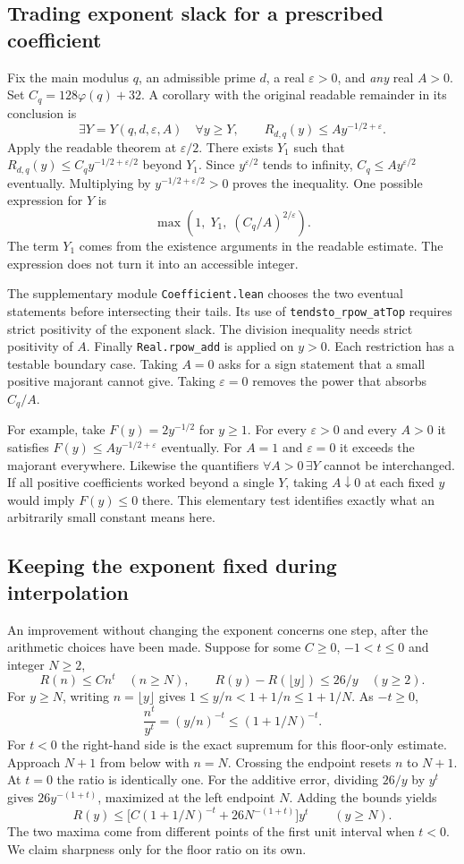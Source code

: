 \documentclass[12pt,letterpaper]{article}
\newcommand{\id}[1]{{\small\nolinkurl{#1}}}
\begin{document}
\subsection{Trading exponent slack for a prescribed coefficient}
Fix the main modulus $q$, an admissible prime $d$, a real $\varepsilon>0$, and \emph{any} real $A>0$. Set $C_q=128\varphi(q)+32$. A corollary with the original readable remainder in its conclusion is
\[
   \exists Y=Y(q,d,\varepsilon,A)\quad
   \forall y\ge Y,\qquad R_{d,q}(y)\le A y^{-1/2+\varepsilon}.
\]
Apply the readable theorem at $\varepsilon/2$. There exists $Y_1$ such that $R_{d,q}(y)\le C_q y^{-1/2+\varepsilon/2}$ beyond $Y_1$. Since $y^{\varepsilon/2}$ tends to infinity, $C_q\le A y^{\varepsilon/2}$ eventually. Multiplying by $y^{-1/2+\varepsilon/2}>0$ proves the inequality. One possible expression for $Y$ is
\[
  \max\!\left(1,\;Y_1,\;(C_q/A)^{2/\varepsilon}\right).
\]
The term $Y_1$ comes from the existence arguments in the readable estimate. The expression does not turn it into an accessible integer.

The supplementary module \id{Coefficient.lean} chooses the two eventual statements before intersecting their tails. Its use of \id{tendsto_rpow_atTop} requires strict positivity of the exponent slack. The division inequality needs strict positivity of $A$. Finally \id{Real.rpow_add} is applied on $y>0$. Each restriction has a testable boundary case. Taking $A=0$ asks for a sign statement that a small positive majorant cannot give. Taking $\varepsilon=0$ removes the power that absorbs $C_q/A$.

For example, take $F(y)=2y^{-1/2}$ for $y\ge1$. For every $\varepsilon>0$ and every $A>0$ it satisfies $F(y)\le A y^{-1/2+\varepsilon}$ eventually. For $A=1$ and $\varepsilon=0$ it exceeds the majorant everywhere. Likewise the quantifiers $\forall A>0\,\exists Y$ cannot be interchanged. If all positive coefficients worked beyond a single $Y$, taking $A\downarrow0$ at each fixed $y$ would imply $F(y)\le0$ there. This elementary test identifies exactly what an arbitrarily small constant means here.

\subsection{Keeping the exponent fixed during interpolation}
An improvement without changing the exponent concerns one step, after the arithmetic choices have been made. Suppose for some $C\ge0$, $-1<t\le0$ and integer $N\ge2$,
\[
 R(n)\le Cn^t\quad(n\ge N),\qquad
 R(y)-R(\lfloor y\rfloor)\le26/y\quad(y\ge2).
\]
For $y\ge N$, writing $n=\lfloor y\rfloor$ gives $1\le y/n<1+1/n\le1+1/N$. As $-t\ge0$,
\[
  \frac{n^t}{y^t}=(y/n)^{-t}\le (1+1/N)^{-t}.
\]
For $t<0$ the right-hand side is the exact supremum for this floor-only estimate. Approach $N+1$ from below with $n=N$. Crossing the endpoint resets $n$ to $N+1$. At $t=0$ the ratio is identically one. For the additive error, dividing $26/y$ by $y^t$ gives $26y^{-(1+t)}$, maximized at the left endpoint $N$. Adding the bounds yields
\[
 R(y)\le \big[C(1+1/N)^{-t}+26N^{-(1+t)}\big]y^t\qquad(y\ge N).
 \tag{*}
\]
The two maxima come from different points of the first unit interval when $t<0$. We claim sharpness only for the floor ratio on its own.
\end{document}
